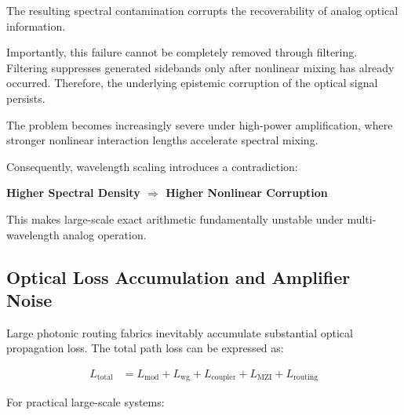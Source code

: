 \documentclass[journal]{IEEEtran}
\begin{document}
The resulting spectral contamination corrupts the recoverability of analog optical information.

Importantly, this failure cannot be completely removed through filtering. Filtering suppresses generated sidebands only after nonlinear mixing has already occurred. Therefore, the underlying epistemic corruption of the optical signal persists.

The problem becomes increasingly severe under high-power amplification, where stronger nonlinear interaction lengths accelerate spectral mixing.

Consequently, wavelength scaling introduces a contradiction:

\begin{center}
\textbf{Higher Spectral Density $\Longrightarrow$ Higher Nonlinear Corruption}
\label{eq:wdm_contradiction}
\end{center}

This makes large-scale exact arithmetic fundamentally unstable under multi-wavelength analog operation.

\subsection{\textbf{Optical Loss Accumulation and Amplifier Noise}}

Large photonic routing fabrics inevitably accumulate substantial optical propagation loss. The total path loss can be expressed as:

\begin{align}
L_{\mathrm{total}}
&=
L_{\mathrm{mod}}
+
L_{\mathrm{wg}}
+
L_{\mathrm{coupler}}
+
L_{\mathrm{MZI}}
+
L_{\mathrm{routing}}
\label{eq:total_loss}
\end{align}

For practical large-scale systems:

\begin{center}
\end{center}

\begin{center}
\end{center}

\begin{center}
\end{center}

\begin{center}
\end{center}
\end{document}
